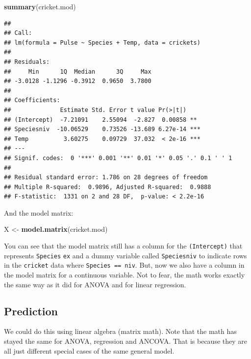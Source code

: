 \documentclass[
]{book}
\newenvironment{Shaded}{\begin{snugshade}}{\end{snugshade}}
\newcommand{\KeywordTok}[1]{\textcolor[rgb]{0.13,0.29,0.53}{\textbf{#1}}}
\newcommand{\NormalTok}[1]{#1}
\newcommand{\StringTok}[1]{\textcolor[rgb]{0.31,0.60,0.02}{#1}}
\begin{document}
\begin{Shaded}
\begin{Highlighting}[]
\KeywordTok{summary}\NormalTok{(cricket.mod)}
\end{Highlighting}
\end{Shaded}

\begin{verbatim}
## 
## Call:
## lm(formula = Pulse ~ Species + Temp, data = crickets)
## 
## Residuals:
##     Min      1Q  Median      3Q     Max 
## -3.0128 -1.1296 -0.3912  0.9650  3.7800 
## 
## Coefficients:
##              Estimate Std. Error t value Pr(>|t|)    
## (Intercept)  -7.21091    2.55094  -2.827  0.00858 ** 
## Speciesniv  -10.06529    0.73526 -13.689 6.27e-14 ***
## Temp          3.60275    0.09729  37.032  < 2e-16 ***
## ---
## Signif. codes:  0 '***' 0.001 '**' 0.01 '*' 0.05 '.' 0.1 ' ' 1
## 
## Residual standard error: 1.786 on 28 degrees of freedom
## Multiple R-squared:  0.9896,	Adjusted R-squared:  0.9888 
## F-statistic:  1331 on 2 and 28 DF,  p-value: < 2.2e-16
\end{verbatim}

And the model matrix:

\begin{Shaded}
\begin{Highlighting}[]
\NormalTok{X <-}\StringTok{ }\KeywordTok{model.matrix}\NormalTok{(cricket.mod)}
\end{Highlighting}
\end{Shaded}

You can see that the model matrix still has a column for the \texttt{(Intercept)} that represents \texttt{Species} \texttt{ex} and a dummy variable called \texttt{Speciesniv} to indicate rows in the \texttt{cricket} data where \texttt{Species\ ==\ niv}. But, now we also have a column in the model matrix for a continuous variable. Not to fear, the math works exactly the same way as it did for ANOVA and for linear regression.

\hypertarget{prediction-2}{%
\subsection{Prediction}\label{prediction-2}}

We could do this using linear algebra (matrix math). Note that the math has stayed the same for ANOVA, regression and ANCOVA. That is because they are all just different special cases of the same general model.
\end{document}
